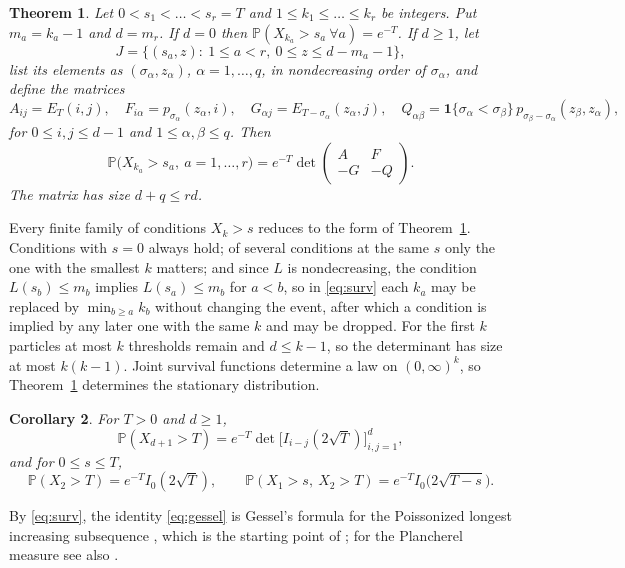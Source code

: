 \documentclass[11pt]{amsart}
\newtheorem{theorem}{Theorem}[section]
\newtheorem{corollary}[theorem]{Corollary}
\theoremstyle{remark}
\numberwithin{equation}{section}
\newcommand{\Pp}{\mathbb P}
\begin{document}
\begin{theorem}\label{thm:det}
Let $0<s_1<\dots<s_r=T$ and $1\le k_1\le\dots\le k_r$ be integers. Put $m_a=k_a-1$ and $d=m_r$. If $d=0$ then $\Pp(X_{k_a}>s_a\ \forall a)=e^{-T}$. If $d\ge1$, let
\[
J=\bigl\{(s_a,z):\ 1\le a<r,\ 0\le z\le d-m_a-1\bigr\},
\]
list its elements as $(\sigma_\alpha,z_\alpha)$, $\alpha=1,\dots,q$, in nondecreasing order of $\sigma_\alpha$, and define the matrices
\[
A_{ij}=E_T(i,j),\quad F_{i\alpha}=p_{\sigma_\alpha}(z_\alpha,i),\quad G_{\alpha j}=E_{T-\sigma_\alpha}(z_\alpha,j),\quad Q_{\alpha\beta}=\mathbf 1\{\sigma_\alpha<\sigma_\beta\}\,p_{\sigma_\beta-\sigma_\alpha}(z_\beta,z_\alpha),
\]
for $0\le i,j\le d-1$ and $1\le\alpha,\beta\le q$. Then
\begin{equation}\label{eq:det}
\Pp\bigl(X_{k_a}>s_a,\ a=1,\dots,r\bigr)=e^{-T}\det\begin{pmatrix}A&F\\-G&-Q\end{pmatrix}.
\end{equation}
The matrix has size $d+q\le rd$.
\end{theorem}

Every finite family of conditions $X_{k}>s$ reduces to the form of Theorem~\ref{thm:det}. Conditions with $s=0$ always hold; of several conditions at the same $s$ only the one with the smallest $k$ matters; and since $L$ is nondecreasing, the condition $L(s_b)\le m_b$ implies $L(s_a)\le m_b$ for $a<b$, so in \eqref{eq:surv} each $k_a$ may be replaced by $\min_{b\ge a}k_b$ without changing the event, after which a condition is implied by any later one with the same $k$ and may be dropped. For the first $k$ particles at most $k$ thresholds remain and $d\le k-1$, so the determinant has size at most $k(k-1)$. Joint survival functions determine a law on $(0,\infty)^k$, so Theorem~\ref{thm:det} determines the stationary distribution.

\begin{corollary}\label{cor:small}
For $T>0$ and $d\ge1$,
\begin{equation}\label{eq:gessel}
\Pp(X_{d+1}>T)=e^{-T}\det\bigl[I_{i-j}(2\sqrt T)\bigr]_{i,j=1}^{d},
\end{equation}
and for $0\le s\le T$,
\begin{equation}\label{eq:two}
\Pp(X_2>T)=e^{-T}I_0(2\sqrt T),\qquad \Pp(X_1>s,\ X_2>T)=e^{-T}I_0\bigl(2\sqrt{T-s}\bigr).
\end{equation}
\end{corollary}

By \eqref{eq:surv}, the identity \eqref{eq:gessel} is Gessel's formula for the Poissonized longest increasing subsequence \cite{Ges90}, which is the starting point of \cite{BDJ99}; for the Plancherel measure see also \cite{Joh01}.
\end{document}

